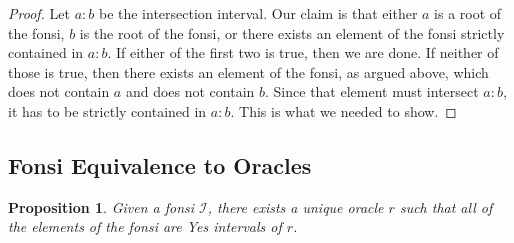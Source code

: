 \documentclass[12pt]{article}
\newtheorem{proposition}{Proposition}[subsection]
\begin{document}
\begin{proof}
    Let $a:b$ be the intersection interval. Our claim is that either $a$ is a root of the fonsi, $b$ is the root of the fonsi, or there exists an element of the fonsi strictly contained in $a:b$. If either of the first two is true, then we are done. If neither of those is true, then there exists an element of the fonsi, as argued above, which does not contain $a$ and does not contain $b$. Since that element must intersect $a:b$, it has to be strictly contained in $a:b$. This is what we needed to show. 
\end{proof}

\subsection{Fonsi Equivalence to Oracles}


\begin{proposition}\label{pr:fon-oracle-exists}
Given a fonsi $\mathcal{I}$, there exists a unique oracle $r$ such that all of the elements of the fonsi are Yes intervals of $r$.
\end{proposition}
\end{document}
